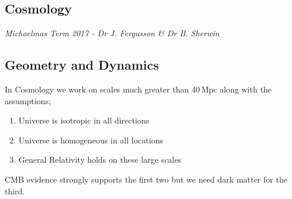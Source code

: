 \label{cosmo}
\begin{chapterbox}
\vspace{-60pt}
\chapter{Cosmology}
\vspace{-30pt}
\centering\normalsize\textit{Michaelmas Term 2017 - Dr J. Fergusson \& Dr B. Sherwin}
\end{chapterbox}
\vspace{20pt}
\minitoc
\newpage
\section{Geometry and Dynamics}
In Cosmology we work on scales much greater than $40 \, \textrm{Mpc}$ along with the assumptions;
\begin{enumerate}
\item Universe is isotropic in all directions
\item Universe is homogeneous in all locations
\item General Relativity holds on these large scales
\end{enumerate}
CMB evidence strongly supports the first two but we need dark matter for the third.
